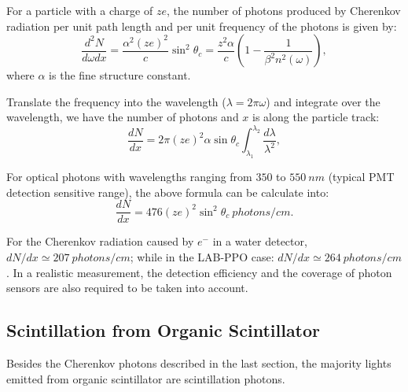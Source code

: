 For a particle with a charge of $ze$, the number of photons produced by Cherenkov radiation per unit path length and per unit frequency of the photons is given by\cite{leo2012techniques}:
\[
\frac{d^2N}{d\omega dx}=\frac{\alpha^2 (ze)^2}{c}\sin^2\theta_c=\frac{z^2\alpha}{c}(1-\frac{1}{\beta^2 n^2(\omega)}),
\]
where $\alpha$ is the fine structure constant.

Translate the frequency into the wavelength ($\lambda=2\pi\omega$) and integrate over the wavelength, we have the number of photons and $x$ is along the particle track\cite{leo2012techniques}:
\[
\frac{dN}{dx}=2\pi (ze)^2\alpha\sin\theta_c\int_{\lambda_1}^{\lambda_2}\frac{d\lambda}{\lambda^2},
\]

For optical photons with wavelengths ranging from $350$ to $550~nm$ (typical PMT detection sensitive range), the above formula can be calculate into\cite{leo2012techniques}:
\[
\frac{dN}{dx}=476(ze)^2\sin^2\theta_c~photons/cm.
\]

For the Cherenkov radiation caused by $e^-$ in a water detector, $dN/dx \simeq 207~photons/cm$; while in the LAB-PPO case: $dN/dx \simeq 264~photons/cm$. In a realistic measurement, the detection efficiency and the coverage of photon sensors are also required to be taken into account.

\subsection{Scintillation from Organic Scintillator}

Besides the Cherenkov photons described in the last section, the majority lights emitted from organic scintillator are scintillation photons.

